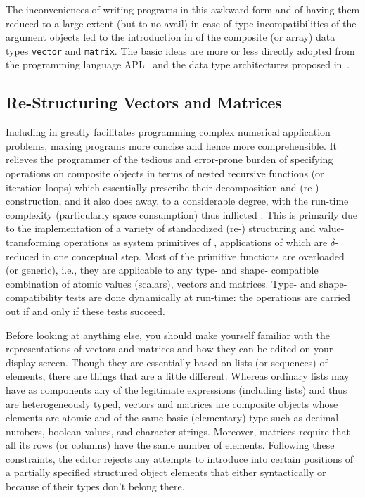 The inconveniences of writing programs in this awkward form and
of having them reduced to a large extent (but to
 no avail) in case of {\mys type incompatibilities} of the argument
 objects led to the introduction in \kir of the {\mys composite} (or
{\mys array})
{\mys data types} {\tt vector} and {\tt matrix}. The basic ideas are
more or less directly adopted from the programming language 
APL~\cite{iv62} and the {\mys data type architectures} proposed in~\cite{abr70,gi82}.

\subsection{Re-Structuring Vectors and Matrices}
Including in  greatly facilitates
programming complex numerical application problems, making
programs more concise and hence more comprehensible. It relieves the
programmer of the tedious and error-prone burden of specifying
operations on composite objects in terms of nested recursive
functions (or iteration loops) which essentially prescribe their
decomposition and (re-) construction, and it also does
away, to a considerable degree, with the run-time complexity
(particularly space consumption) thus inflicted . This is
primarily due to the implementation of a variety of standardized
(re-) structuring and value-transforming operations as 
{\mys system primitives} of \pired, applications of which
 are $\delta$-reduced in one conceptual step. Most of
the primitive functions are {\mys overloaded}
(or {\mys generic}), i.e., they are applicable to any type- and shape-
compatible combination of atomic values (scalars), vectors
 and matrices. Type- and shape-compatibility tests are done
 dynamically at run-time: the operations are carried out if and
only if these tests succeed.

Before looking at 
anything else, you should make yourself familiar with the
\kir representations of vectors and matrices
and how they can be edited on your display screen. Though
they are essentially based on lists (or sequences) of elements,
there are things that are a little different. Whereas ordinary
lists may have as components any of the legitimate \kir expressions (including lists) and thus are heterogeneously typed, vectors
and matrices are composite objects whose elements are atomic and of the
same basic (elementary) type such as decimal numbers,
 boolean values, and character strings. Moreover,  matrices
 require that all its rows (or columns) have the same number of
 elements. Following these constraints, 
the editor rejects any attempts to introduce into
certain positions of 
a partially specified structured object elements that either syntactically or
because of their types don't
belong there. 

